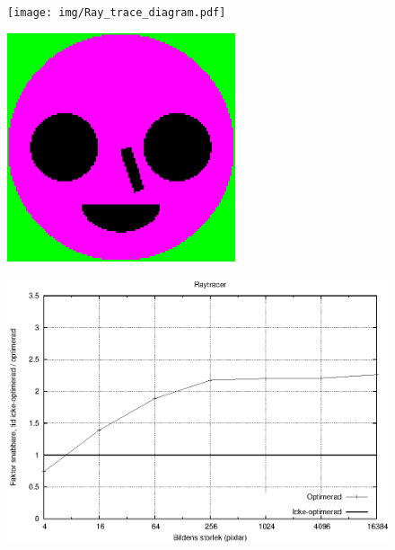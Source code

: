 \documentclass{beamer}
\begin{document}
\begin{frame}
\begin{figure}[H]
\centering
    \texttt{[image: img/Ray\_trace\_diagram.pdf]} 
\end{figure}

\end{frame}
\begin{frame}

\begin{figure}[H]
\centering
    \includegraphics[width=0.6\textwidth]{img/shapes.png} 
\end{figure}


\end{frame}
\begin{frame}
\begin{figure}[H]
\includegraphics[width=1\textwidth]{shapesnormnocb.eps}
\end{figure}


\end{frame}
\end{document}
